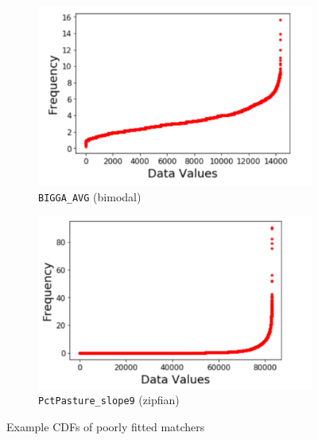\begin{figure}
	\centering
	\begin{subfigure}{0.49\columnwidth}
		\includegraphics[width=1.1\textwidth]{graphics/Challenge1_1}
		\caption{\texttt{BIGGA\_AVG} (bimodal)}
		\label{fig:Distribution1}
	\end{subfigure}
	\begin{subfigure}{0.49\columnwidth}
		\includegraphics[width=1.1\textwidth]{graphics/Challenge7_1}
		\caption{\texttt{PctPasture\_slope9} (zipfian)}
		\label{fig:Distribution3}
	\end{subfigure}
	\trimfigurespacing
	\caption{Example CDFs of poorly fitted matchers}
	\label{fig:baddistributions}
	\trimfigurespacing
\end{figure}


